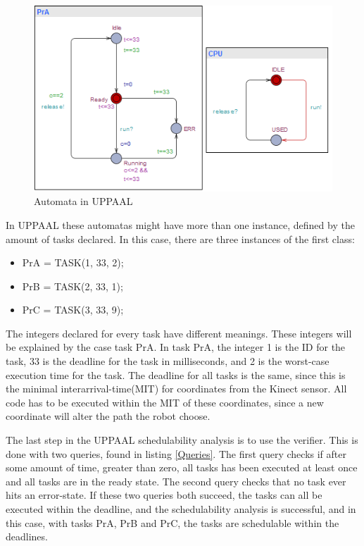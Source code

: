\begin{figure}[h]
	\centering
	\includegraphics[scale=1]{billeder/UPPAALPr}
	\caption{Automata in UPPAAL}
	\label{UPPAAL Automata}
\end{figure}

In UPPAAL these automatas might have more than one instance, defined by the amount of tasks declared. In this case, there are three instances of the first class:

\begin{itemize}
	\item PrA = TASK(1, 33, 2);
	\item PrB = TASK(2, 33, 1);
	\item PrC = TASK(3, 33, 9);
\end{itemize}

The integers declared for every task have different meanings. These integers will be explained by the case task PrA. In task PrA, the integer 1 is the ID for the task, 33 is the deadline for the task in milliseconds, and 2 is the worst-case execution time for the task. The deadline for all tasks is the same, since this is the minimal interarrival-time(MIT) for coordinates from the Kinect sensor. All code has to be executed within the MIT of these coordinates, since a new coordinate will alter the path the robot choose.

The last step in the UPPAAL schedulability analysis is to use the verifier. This is done with two queries, found in listing \ref{Queries}. The first query checks if after some amount of time, greater than zero, all tasks has been executed at least once and all tasks are in the ready state. The second query checks that no task ever hits an error-state. If these two queries both succeed, the tasks can all be executed within the deadline, and the schedulability analysis is successful, and in this case, with tasks PrA, PrB and PrC, the tasks are schedulable within the deadlines.

